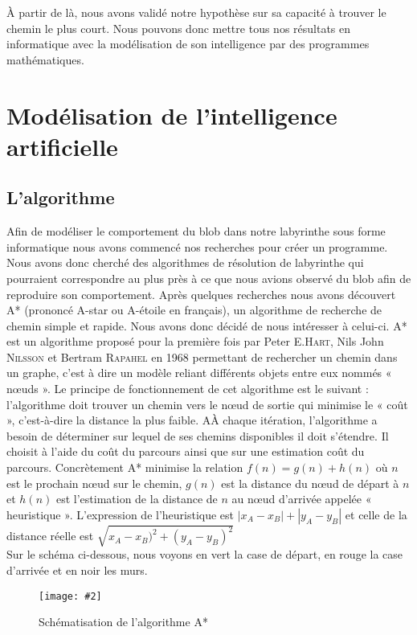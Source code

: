 \documentclass[]{report}
\newcommand{\includeimage}[2][]{%
\imgsrc{#2}
\begin{latexonly}
    \texttt{[image: \#2]}
\end{latexonly}
}
\theoremstyle{definition}
\begin{document}
{À partir de là, nous avons validé notre hypothèse sur sa capacité à trouver le chemin le plus court. Nous pouvons donc mettre tous nos résultats en informatique avec la modélisation de son intelligence par des programmes mathématiques.}

\section{Modélisation de l'intelligence artificielle}

\subsection{L'algorithme}

{Afin de modéliser le comportement du blob dans notre labyrinthe sous forme informatique nous avons commencé nos recherches pour créer un programme. Nous avons donc cherché des algorithmes de résolution de labyrinthe qui pourraient correspondre au plus près à ce que nous avions observé du blob afin de reproduire son comportement. 
Après quelques recherches nous avons découvert A* (prononcé A-star ou A-étoile en français), un algorithme de recherche de chemin simple et rapide. Nous avons donc décidé de nous intéresser à celui-ci. 
A* est un algorithme proposé pour la première fois par Peter \textsc{E.Hart}, Nils John \textsc{Nilsson} et Bertram \textsc{Rapahel} en 1968  permettant de rechercher un chemin dans un graphe, c’est à dire un modèle reliant différents objets entre eux nommés « nœuds ». Le principe de fonctionnement de cet algorithme est le suivant : l’algorithme doit trouver un chemin vers le nœud de sortie qui minimise le « coût », c’est-à-dire la distance la plus faible. AÀ chaque itération, l’algorithme a besoin de déterminer sur lequel de ses chemins disponibles il doit s’étendre. Il choisit à l’aide du coût du parcours ainsi que sur une estimation coût du parcours. 
Concrètement A* minimise la relation \(f(n)=g(n)+h(n)\) où \(n\) est le prochain nœud sur le chemin, \(g(n)\) est la distance du nœud de départ à \(n\) et \(h(n)\) est l’estimation de la distance de \(n\) au nœud d’arrivée appelée « heuristique ». L’expression de l’heuristique est \(|x_A-x_ B|+|y_A-y_B|\)  et celle de la distance réelle est \(\sqrt{x_A-x _B)^2+(y_A-y_B)^2}\)}\\
{Sur le schéma ci-dessous, nous voyons en vert la case de départ, en rouge la case d’arrivée et en noir les murs.}

\begin{figure}[H]
    \centering
    \includeimage[height=5cm]{astar.png}
    \caption{Schématisation de l'algorithme A*}
\end{figure}
\end{document}
